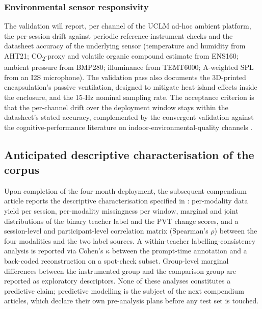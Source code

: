 \subsubsection{Environmental sensor responsivity}\label{subsec:val-ambient}

The validation will report, per channel of the UCLM ad-hoc ambient platform, the per-session drift against periodic reference-instrument checks and the datasheet accuracy of the underlying sensor (temperature and humidity from AHT21; CO\textsubscript{2}-proxy and volatile organic compound estimate from ENS160; ambient pressure from BMP280; illuminance from TEMT6000; A-weighted SPL from an I2S microphone). The validation pass also documents the 3D-printed encapsulation's passive ventilation, designed to mitigate heat-island effects inside the enclosure, and the 15-Hz nominal sampling rate. The acceptance criterion is that the per-channel drift over the deployment window stays within the datasheet's stated accuracy, complemented by the convergent validation against the cognitive-performance literature on indoor-environmental-quality channels \parencite{Wargocki2007_effects,Bako2012_classroom,Satish2012_co2,Petersen2016_classroom,Mendell2013_ventilation,Allen2016_cogfx,Twardella2012_co2_classroom}.

\subsection{Anticipated descriptive characterisation of the corpus}\label{subsec:anticipated}

Upon completion of the four-month deployment, the subsequent compendium article reports the descriptive characterisation specified in : per-modality data yield per session, per-modality missingness per window, marginal and joint distributions of the binary teacher label and the PVT change scores, and a session-level and participant-level correlation matrix (Spearman's $\rho$) between the four modalities and the two label sources. A within-teacher labelling-consistency analysis is reported via Cohen's $\kappa$ between the prompt-time annotation and a back-coded reconstruction on a spot-check subset. Group-level marginal differences between the instrumented group and the comparison group are reported as exploratory descriptors. None of these analyses constitutes a predictive claim; predictive modelling is the subject of the next compendium articles, which declare their own pre-analysis plans before any test set is touched.
